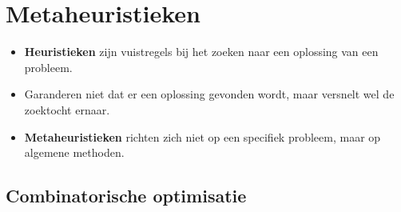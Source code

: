 \chapter{Metaheuristieken}
\begin{itemize}
    \item \textbf{Heuristieken} zijn vuistregels bij het zoeken naar een oplossing van een probleem.
    \item Garanderen niet dat er een oplossing gevonden wordt, maar versnelt wel de zoektocht ernaar.
    \item \textbf{Metaheuristieken} richten zich niet op een specifiek probleem, maar op algemene methoden.
\end{itemize}

\section{Combinatorische optimisatie}
